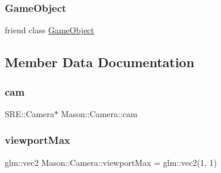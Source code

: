 \hypertarget{class_mason_1_1_camera_a00df87c957d8f7ee0fc51f07a0542f4a}{}\label{class_mason_1_1_camera_a00df87c957d8f7ee0fc51f07a0542f4a} 
\subsubsection{\texorpdfstring{Game\+Object}{GameObject}}
{\footnotesize\ttfamily friend class \hyperlink{class_mason_1_1_game_object}{Game\+Object}\hspace{0.3cm}{\ttfamily [friend]}}



\subsection{Member Data Documentation}
\hypertarget{class_mason_1_1_camera_a74f870fa866086c21f28f0a1f59254cc}{}\label{class_mason_1_1_camera_a74f870fa866086c21f28f0a1f59254cc} 
\subsubsection{\texorpdfstring{cam}{cam}}
{\footnotesize\ttfamily S\+R\+E\+::\+Camera$\ast$ Mason\+::\+Camera\+::cam\hspace{0.3cm}{\ttfamily [protected]}}

\hypertarget{class_mason_1_1_camera_a8c7510e4c83e123aebbe7bb36da80de9}{}\label{class_mason_1_1_camera_a8c7510e4c83e123aebbe7bb36da80de9} 
\subsubsection{\texorpdfstring{viewport\+Max}{viewportMax}}
{\footnotesize\ttfamily glm\+::vec2 Mason\+::\+Camera\+::viewport\+Max = glm\+::vec2(1, 1)\hspace{0.3cm}{\ttfamily [protected]}}

\hypertarget{class_mason_1_1_camera_a87d7d4111e63ecb41bac7ea33ef270e1}{}\label{class_mason_1_1_camera_a87d7d4111e63ecb41bac7ea33ef270e1} 

